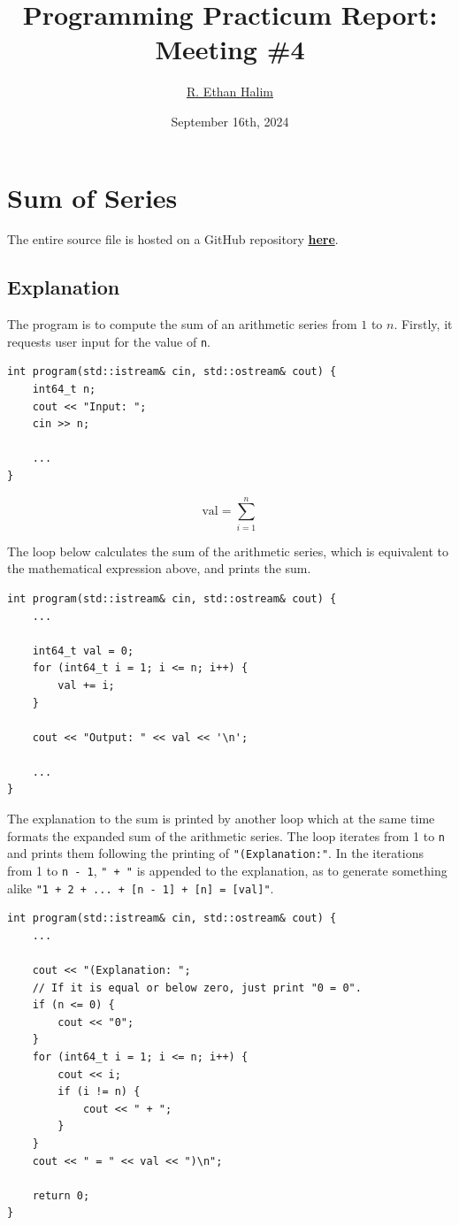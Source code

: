 \documentclass[12pt]{article}
\title{Programming Practicum Report:\\Meeting \#4}
\author{\href{https://github.com/avaxar}{R. Ethan Halim}}
\date{September 16th, 2024}
\begin{document}
\maketitle

\section{Sum of Series}
The entire source file is hosted on a GitHub repository \href{https://github.com/avaxar/uni-practica-1/tree/main/week_4/01_sum}{\textbf{here}}.

\subsection{Explanation}

The program is to compute the sum of an arithmetic series from $1$ to $n$. Firstly, it requests user input for the value of \texttt{n}.

\begin{verbatim}
int program(std::istream& cin, std::ostream& cout) {
    int64_t n;
    cout << "Input: ";
    cin >> n;

    ...
}
\end{verbatim}

$$\text{val} = \sum_{i = 1}^n$$

The loop below calculates the sum of the arithmetic series, which is equivalent to the mathematical expression above, and prints the sum.

\begin{verbatim}
int program(std::istream& cin, std::ostream& cout) {
    ...

    int64_t val = 0;
    for (int64_t i = 1; i <= n; i++) {
        val += i;
    }

    cout << "Output: " << val << '\n';

    ...
}
\end{verbatim}

The explanation to the sum is printed by another loop which at the same time formats the expanded sum of the arithmetic series. The loop iterates from 1 to \texttt{n} and prints them following the printing of \texttt{"(Explanation:"}. In the iterations from 1 to \texttt{n - 1}, \texttt{" + "} is appended to the explanation, as to generate something alike \texttt{"1 + 2 + ... + [n - 1] + [n] = [val]"}.

\begin{verbatim}
int program(std::istream& cin, std::ostream& cout) {
    ...

    cout << "(Explanation: ";
    // If it is equal or below zero, just print "0 = 0".
    if (n <= 0) {
        cout << "0";
    }
    for (int64_t i = 1; i <= n; i++) {
        cout << i;
        if (i != n) {
            cout << " + ";
        }
    }
    cout << " = " << val << ")\n";

    return 0;
}
\end{verbatim}
\end{document}
